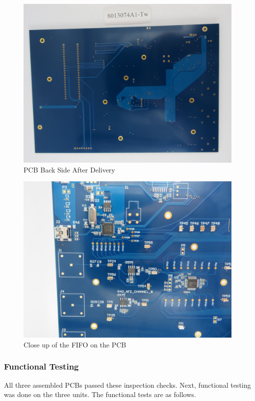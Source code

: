 \documentclass[letterpaper,11pt]{article}
\begin{document}
\begin{figure}[H]
  \centering
  \includegraphics[width=12cm]{figures/pcb-back.JPG}
  \caption{PCB Back Side After Delivery}
  \label{fig:pcb-back}
\end{figure}

\begin{figure}[H]
  \centering
  \includegraphics[width=12cm]{figures/pcb-closeup.JPG}
  \caption{Close up of the FIFO on the PCB}
  \label{fig:area-around-fifo}
\end{figure}

\subsubsection{Functional Testing}
All three assembled PCBs passed these inspection checks. Next, functional
testing was done on the three units. The functional tests are as follows.
\end{document}
